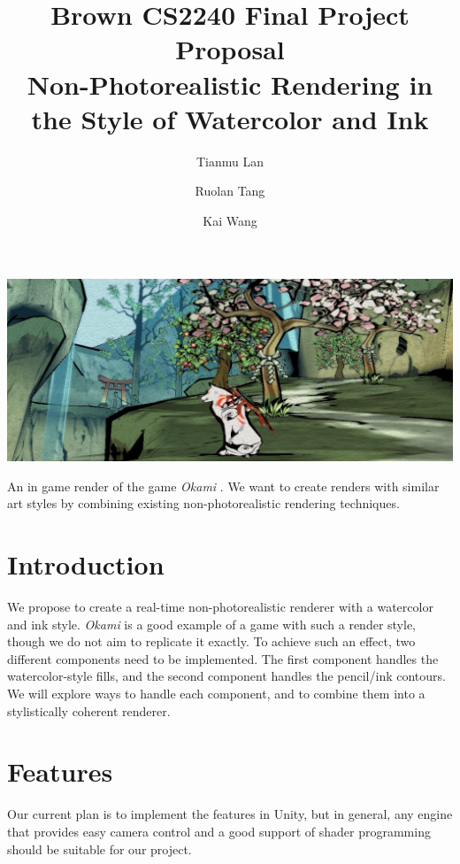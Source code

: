\documentclass[acmtog, table, dvipsnames]{acmart}
\begin{document}
\title{\textbf{Brown CS2240 Final Project Proposal} \\
       Non-Photorealistic Rendering in the Style of Watercolor and Ink}
\author{Tianmu Lan}
\author{Ruolan Tang}
\author{Kai Wang}
\begin{teaserfigure}
  \centering
  \includegraphics[width=\linewidth]{okami.jpg}
  \caption{An in game render of the game \textit{Okami} \cite{Okami}. We want to create renders with similar art styles by combining existing non-photorealistic rendering techniques.}
\end{teaserfigure}

\maketitle

\section{Introduction}

We propose to create a real-time non-photorealistic renderer with a watercolor and ink style. \textit{Okami} \cite{Okami} is a good example of a game with such a render style, though we do not aim to replicate it exactly. To achieve such an effect, two different components need to be implemented. The first component handles the watercolor-style fills, and the second component handles the pencil/ink contours. We will explore ways to handle each component, and to combine them into a stylistically coherent renderer. 

\section{Features}
Our current plan is to implement the features in Unity, but in general, any engine that provides easy camera control and a good support of shader programming should be suitable for our project.
\end{document}
